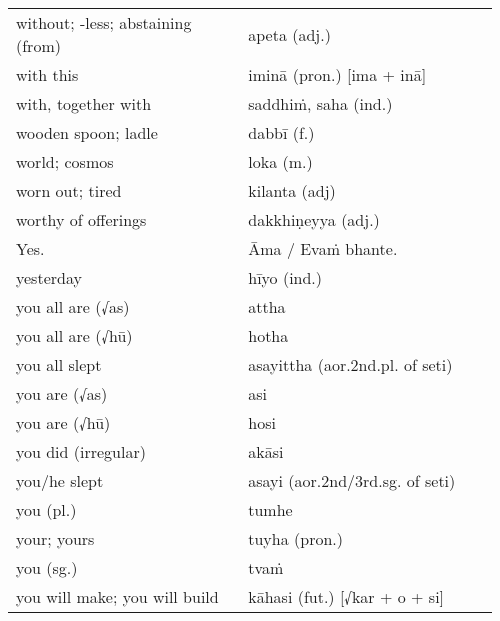 \documentclass[a5paper]{memoir}
\begin{document}
\begin{longtable}{L{0.48\linewidth} L{0.48\linewidth} H}
without; -less; abstaining (from) & apeta (adj.) & \\[0pt]
with this & iminā (pron.) [ima + inā] & \\[0pt]
with, together with & saddhiṁ, saha (ind.) & \\[0pt]
wooden spoon; ladle & dabbī (f.) & \\[0pt]
world; cosmos & loka (m.) & \\[0pt]
worn out; tired & kilanta (adj) & \\[0pt]
worthy of offerings & dakkhiṇeyya (adj.) & \\[0pt]
Yes. & Āma / Evaṁ bhante. & \\[0pt]
yesterday & hīyo (ind.) & \\[0pt]
you all are (√as) & attha & \\[0pt]
you all are (√hū) & hotha & \\[0pt]
you all slept & asayittha (aor.2nd.pl. of seti) & \\[0pt]
you are (√as) & asi & \\[0pt]
you are (√hū) & hosi & \\[0pt]
you did (irregular) & akāsi & \\[0pt]
you/he slept & asayi (aor.2nd/3rd.sg. of seti) & \\[0pt]
you (pl.) & tumhe & \\[0pt]
your; yours & tuyha (pron.) & \\[0pt]
you (sg.) & tvaṁ & \\[0pt]
you will make; you will build & kāhasi (fut.) [√kar + o + si] & \\[0pt]
\end{longtable}
\end{document}
